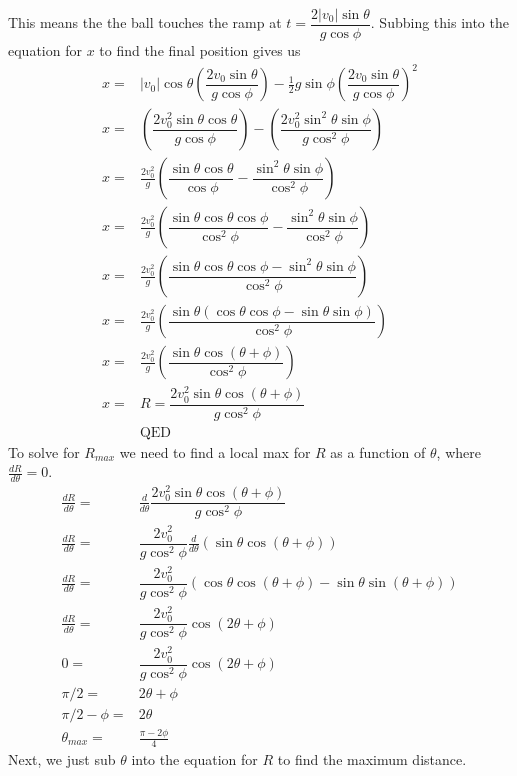 \documentclass[12pt, a4paper]{article}
\begin{document}
This means the the ball touches the ramp at $t = \dfrac{2|v_0|\sin\theta}{g\cos\phi}$. Subbing this into the equation for $x$ to find the final position gives us
\begin{align*}
x =& |v_0|\cos\theta \left(\dfrac{2v_0\sin\theta}{g\cos\phi}\right) - \tfrac{1}{2}g\sin\phi \left(\dfrac{2v_0\sin\theta}{g\cos\phi}\right)^2
\\
x =&  \left(\dfrac{2v_0^2\sin\theta\cos\theta}{g\cos\phi}\right) -  \left(\dfrac{2v_0^2\sin^2\theta\sin\phi}{g\cos^2\phi}\right)
\\
x =&  \frac{2v_0^2}{g}\left(\dfrac{\sin\theta\cos\theta}{\cos\phi} -  \dfrac{\sin^2\theta\sin\phi}{\cos^2\phi}\right)
\\
x =&  \frac{2v_0^2}{g}\left(
\dfrac{\sin\theta\cos\theta\cos\phi}{\cos^2\phi} -  
\dfrac{\sin^2\theta\sin\phi}{\cos^2\phi}
\right)
\\
x =&  \frac{2v_0^2}{g}\left(
\dfrac{\sin\theta\cos\theta\cos\phi - \sin^2\theta\sin\phi}{\cos^2\phi}
\right)
\\
x =&  \frac{2v_0^2}{g}\left(
\dfrac{\sin\theta(\cos\theta\cos\phi - \sin\theta\sin\phi)}{\cos^2\phi}
\right)
\\
x =&  \frac{2v_0^2}{g}\left(
\dfrac{\sin\theta\cos(\theta+\phi)}{\cos^2\phi}
\right)
\\
x =& \boxed{R = \dfrac{2v_0^2\sin\theta\cos(\theta+\phi)}{g\cos^2\phi}}
\\
&\text{QED}
\end{align*}
To solve for $R_{max}$ we need to find a local max for $R$ as a function of $\theta$, where $\tfrac{dR}{d\theta}=0$.
\begin{align*}
\frac{dR}{d\theta} =& \frac{d}{d\theta}\dfrac{2v_0^2\sin\theta\cos(\theta+\phi)}{g\cos^2\phi}
\\
\frac{dR}{d\theta} =& \dfrac{2v_0^2}{g\cos^2\phi}\frac{d}{d\theta}\left(\sin\theta\cos(\theta+\phi)\right)
\\
\frac{dR}{d\theta} =& \dfrac{2v_0^2}{g\cos^2\phi}\left(
\cos\theta\cos(\theta+\phi) -
\sin\theta\sin(\theta+\phi)
\right)
\\
\frac{dR}{d\theta} =& \dfrac{2v_0^2}{g\cos^2\phi}\cos(2\theta+\phi)
\\
0 =& \dfrac{2v_0^2}{g\cos^2\phi}\cos(2\theta+\phi)
\\
\pi/2 =& 2\theta+\phi
\\
\pi/2 - \phi =& 2\theta
\\
\theta_{max} =& \boxed{\frac{\pi-2\phi}{4}}
\end{align*}
Next, we just sub $\theta$ into the equation for $R$ to find the maximum distance.
\end{document}
